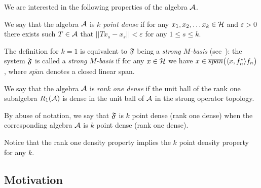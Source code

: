 \documentclass[12pt]{amsart}
\theoremstyle{case}
\begin{document}
    We are interested in the following properties of the algebra $\cal{A}$.
    \begin{definition}
      \label{kpd}
      We say that the algebra $\cal{A}$ is \emph{$k$ point dense} if for any $x_1, x_2,\dots x_k \in \cal{H}$ and $\varepsilon > 0$
        there exists such $T\in \cal{A}$ that $||Tx_s - x_s|| < \varepsilon$ for any $1 \leq s \leq k$.
    \end{definition}
    The definition for $k=1$ is equivalent to $\fsys$ being a \emph{strong $M$-basis} (see~\cite{katavolos}):
      the system $\fsys$ is called a \emph{strong $M$-basis} if for any $x\in\cal{H}$ we have $x \in \overline{span}\big(\inner{x}{f^*_n}f_n\big)$, where
      $\overline{span}$ denotes a closed linear span.
    \begin{definition}
      \label{r1d}
      We say that the algebra $\cal{A}$ is \emph{rank one dense} if the unit ball of the rank one subalgebra $R_1(\cal{A})$
        is dense in the unit ball of $\cal{A}$ in the strong operator topology.
    \end{definition}
    By abuse of notation, we say that $\fsys$ is $k$ point dense (rank one dense)
      when the corresponding algebra $\cal{A}$ is $k$ point dense (rank one dense).

    Notice that the rank one density property implies the $k$ point density property for any $k$.

  \subsection{Motivation}
\end{document}
